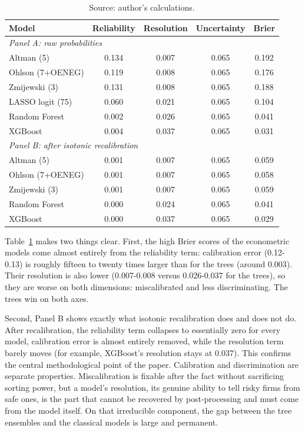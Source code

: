 \documentclass[12pt,a4paper]{article}
\begin{document}
\begin{table}[ht]
\centering
\caption{Brier-score decomposition at horizon H1, before and after isotonic
recalibration. Reliability is calibration error (lower is better); resolution
is sorting power (higher is better); uncertainty (0.065) is the same for all
models. The three terms recombine to the Brier score via
Equation~\ref{eq:brier-decomp}.}
\label{tab:brier-decomp}
\small
\begin{tabular}{lcccc}
\toprule
Model & Reliability & Resolution & Uncertainty & Brier \\
\midrule
\multicolumn{5}{l}{\textit{Panel A: raw probabilities}} \\
\midrule
Altman (5)        & 0.134 & 0.007 & 0.065 & 0.192 \\
Ohlson (7+OENEG)  & 0.119 & 0.008 & 0.065 & 0.176 \\
Zmijewski (3)     & 0.131 & 0.008 & 0.065 & 0.188 \\
LASSO logit (75)  & 0.060 & 0.021 & 0.065 & 0.104 \\
Random Forest     & 0.002 & 0.026 & 0.065 & 0.041 \\
XGBoost           & 0.004 & 0.037 & 0.065 & 0.031 \\
\midrule
\multicolumn{5}{l}{\textit{Panel B: after isotonic recalibration}} \\
\midrule
Altman (5)        & 0.001 & 0.007 & 0.065 & 0.059 \\
Ohlson (7+OENEG)  & 0.001 & 0.007 & 0.065 & 0.058 \\
Zmijewski (3)     & 0.001 & 0.007 & 0.065 & 0.059 \\
Random Forest     & 0.000 & 0.024 & 0.065 & 0.041 \\
XGBoost           & 0.000 & 0.037 & 0.065 & 0.029 \\
\bottomrule
\end{tabular}
\caption*{\footnotesize Source: author's calculations.}
\end{table}

Table~\ref{tab:brier-decomp} makes two things clear. First, the high Brier
scores of the econometric models come almost entirely from the reliability
term: calibration error (0.12-0.13) is roughly fifteen to twenty times
larger than for the trees (around 0.003). Their resolution is also lower
(0.007-0.008 versus 0.026-0.037 for the trees), so they are worse on both
dimensions: miscalibrated and less discriminating. The trees win on both axes.

Second, Panel B shows exactly what isotonic recalibration does and does not
do. After recalibration, the reliability term collapses to essentially zero
for every model, calibration error is almost entirely removed, while the
resolution term barely moves (for example, XGBoost's resolution stays at
0.037). This confirms the central methodological point of the paper.
Calibration and discrimination are separate properties. Miscalibration is
fixable after the fact without sacrificing sorting power, but a model's
resolution, its genuine ability to tell risky firms from safe ones, is the
part that cannot be recovered by post-processing and must come from the model
itself. On that irreducible component, the gap
between the tree ensembles and the classical models is large and permanent.
\end{document}
